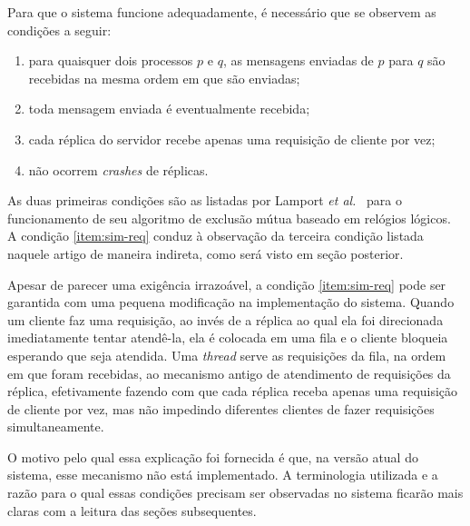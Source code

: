 \documentclass[../main.tex]{subfiles}
\begin{document}
Para que o sistema funcione adequadamente, é necessário que se observem as condições a seguir:

\begin{enumerate}
  \item
    para quaisquer dois processos $p$ e $q$, as mensagens enviadas de $p$ para $q$ são recebidas na mesma ordem em que são enviadas;

  \item
    toda mensagem enviada é eventualmente recebida;

  \item \label{item:sim-req}
    cada réplica do servidor recebe apenas uma requisição de cliente por vez;

  \item
    não ocorrem \textit{crashes} de réplicas.
\end{enumerate}

As duas primeiras condições são as listadas por Lamport \textit{et al.}~\cite{lamport-logical-clocks} para o funcionamento de seu algoritmo de exclusão mútua baseado em relógios lógicos.
A condição \ref{item:sim-req} conduz à observação da terceira condição listada naquele artigo de maneira indireta, como será visto em seção posterior.

Apesar de parecer uma exigência irrazoável, a condição \ref{item:sim-req} pode ser garantida com uma pequena modificação na implementação do sistema.
Quando um cliente faz uma requisição, ao invés de a réplica ao qual ela foi direcionada imediatamente tentar atendê-la, ela é colocada em uma fila e o cliente bloqueia esperando que seja atendida.
Uma \textit{thread} serve as requisições da fila, na ordem em que foram recebidas, ao mecanismo antigo de atendimento de requisições da réplica, efetivamente fazendo com que cada réplica receba apenas uma requisição de cliente por vez, mas não impedindo diferentes clientes de fazer requisições simultaneamente.

O motivo pelo qual essa explicação foi fornecida é que, na versão atual do sistema, esse mecanismo não está implementado.
A terminologia utilizada e a razão para o qual essas condições precisam ser observadas no sistema ficarão mais claras com a leitura das seções subsequentes.
\end{document}

